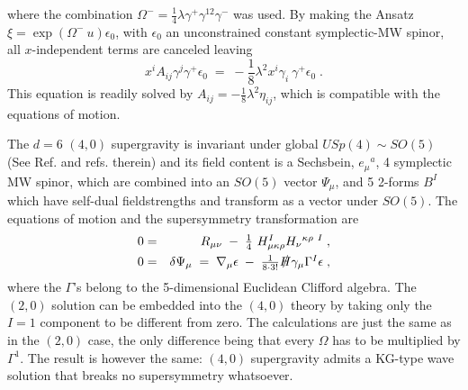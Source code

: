 \documentclass[a4paper,12pt]{article}
\begin{document}
where the combination $\Omega^{-}= \textstyle{\frac{1}{4}}\lambda\gamma^{+}\gamma^{12}\gamma^{-}$ was used.
By making the Ansatz $\xi = \exp\left( \Omega^{-}\ u\right)\epsilon_{0}$, with $\epsilon_{0}$ an unconstrained
constant symplectic-MW spinor, all $x$-independent terms are canceled leaving
\begin{equation}
  \label{eq:d=6_cond_A}
  x^{i}A_{ij}\gamma^{j}\gamma^{+}\epsilon_{0} \;=\; -\textstyle{\frac{1}{8}}\lambda^{2} x^{i}\gamma_{i}\ \gamma^{+}\epsilon_{0} \; .
\end{equation}
This equation is readily solved by $A_{ij}=-\textstyle{\frac{1}{8}}\lambda^{2}\eta_{ij}$, which is compatible
with the equations of motion.
%
%
\par
The $d=6$ $(4,0)$ supergravity is invariant under global $USp(4)\sim SO(5)$ (See Ref. \cite{art:romans} and refs. therein) 
and its field content is a Sechsbein, $e_{\mu}{}^{a}$, 
4 symplectic MW spinor, which are combined into an $SO(5)$ vector $\Psi_{\mu}$, and 5 2-forms $B^{I}$ which 
have self-dual fieldstrengths and transform as a vector under $SO(5)$. The equations of motion and the 
supersymmetry transformation are
\begin{eqnarray}
0 &=& R_{\mu\nu} \;-\; \textstyle{\frac{1}{4}}\ H_{\mu\kappa\rho}^{I}H_{\nu}{}^{\kappa\rho\ I} \; , \nonumber \\
0 &=& \delta\Psi_{\mu} \;=\; \nabla_{\mu}\epsilon \;-\; 
        \textstyle{\frac{1}{8\cdot 3!}}\slashed{H}\gamma_{\mu}\Gamma^{I}\epsilon \; ,                      
\end{eqnarray} 
where the $\Gamma$'s belong to the 5-dimensional Euclidean Clifford algebra. The
$(2,0)$ solution can be embedded into the $(4,0)$ theory by taking only the $I=1$ component to be different
from zero. The calculations are just the same as in the $(2,0)$ case, the only difference being that 
every $\Omega$ has to be multiplied by $\Gamma^{1}$. The result is however the same: $(4,0)$ supergravity
admits a KG-type wave solution that breaks no supersymmetry whatsoever. 
%
%
\end{document}
